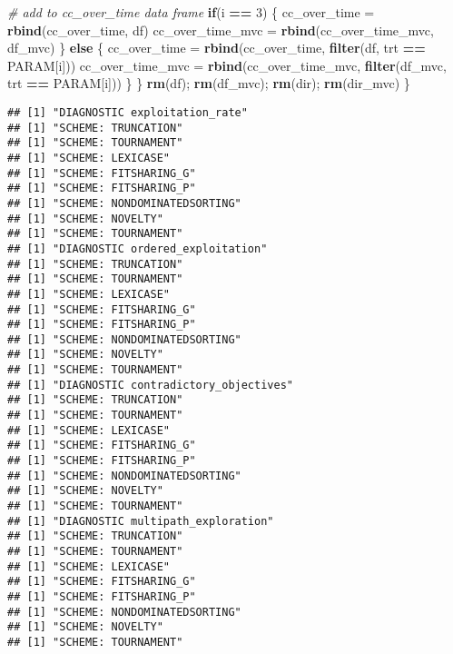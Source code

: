 \documentclass[]{book}
\newenvironment{Shaded}{\begin{snugshade}}{\end{snugshade}}
\newcommand{\CommentTok}[1]{\textcolor[rgb]{0.56,0.35,0.01}{\textit{#1}}}
\newcommand{\ControlFlowTok}[1]{\textcolor[rgb]{0.13,0.29,0.53}{\textbf{#1}}}
\newcommand{\DecValTok}[1]{\textcolor[rgb]{0.00,0.00,0.81}{#1}}
\newcommand{\KeywordTok}[1]{\textcolor[rgb]{0.13,0.29,0.53}{\textbf{#1}}}
\newcommand{\NormalTok}[1]{#1}
\newcommand{\OperatorTok}[1]{\textcolor[rgb]{0.81,0.36,0.00}{\textbf{#1}}}
\newcommand{\StringTok}[1]{\textcolor[rgb]{0.31,0.60,0.02}{#1}}
\begin{document}
\begin{Shaded}
\begin{Highlighting}[]
    \CommentTok{# add to cc_over_time data frame}
    \ControlFlowTok{if}\NormalTok{(i }\OperatorTok{==}\StringTok{ }\DecValTok{3}\NormalTok{)}
\NormalTok{    \{}
\NormalTok{      cc_over_time =}\StringTok{ }\KeywordTok{rbind}\NormalTok{(cc_over_time, df)}
\NormalTok{      cc_over_time_mvc =}\StringTok{ }\KeywordTok{rbind}\NormalTok{(cc_over_time_mvc, df_mvc)}
\NormalTok{    \}}
    \ControlFlowTok{else}
\NormalTok{    \{}
\NormalTok{      cc_over_time =}\StringTok{ }\KeywordTok{rbind}\NormalTok{(cc_over_time, }\KeywordTok{filter}\NormalTok{(df, trt }\OperatorTok{==}\StringTok{ }\NormalTok{PARAM[i]))}
\NormalTok{      cc_over_time_mvc =}\StringTok{ }\KeywordTok{rbind}\NormalTok{(cc_over_time_mvc, }\KeywordTok{filter}\NormalTok{(df_mvc, trt }\OperatorTok{==}\StringTok{ }\NormalTok{PARAM[i]))}
\NormalTok{    \}}
\NormalTok{  \}}
  \KeywordTok{rm}\NormalTok{(df);  }\KeywordTok{rm}\NormalTok{(df_mvc);  }\KeywordTok{rm}\NormalTok{(dir);   }\KeywordTok{rm}\NormalTok{(dir_mvc)}
\NormalTok{\}}
\end{Highlighting}
\end{Shaded}

\begin{verbatim}
## [1] "DIAGNOSTIC exploitation_rate"
## [1] "SCHEME: TRUNCATION"
## [1] "SCHEME: TOURNAMENT"
## [1] "SCHEME: LEXICASE"
## [1] "SCHEME: FITSHARING_G"
## [1] "SCHEME: FITSHARING_P"
## [1] "SCHEME: NONDOMINATEDSORTING"
## [1] "SCHEME: NOVELTY"
## [1] "SCHEME: TOURNAMENT"
## [1] "DIAGNOSTIC ordered_exploitation"
## [1] "SCHEME: TRUNCATION"
## [1] "SCHEME: TOURNAMENT"
## [1] "SCHEME: LEXICASE"
## [1] "SCHEME: FITSHARING_G"
## [1] "SCHEME: FITSHARING_P"
## [1] "SCHEME: NONDOMINATEDSORTING"
## [1] "SCHEME: NOVELTY"
## [1] "SCHEME: TOURNAMENT"
## [1] "DIAGNOSTIC contradictory_objectives"
## [1] "SCHEME: TRUNCATION"
## [1] "SCHEME: TOURNAMENT"
## [1] "SCHEME: LEXICASE"
## [1] "SCHEME: FITSHARING_G"
## [1] "SCHEME: FITSHARING_P"
## [1] "SCHEME: NONDOMINATEDSORTING"
## [1] "SCHEME: NOVELTY"
## [1] "SCHEME: TOURNAMENT"
## [1] "DIAGNOSTIC multipath_exploration"
## [1] "SCHEME: TRUNCATION"
## [1] "SCHEME: TOURNAMENT"
## [1] "SCHEME: LEXICASE"
## [1] "SCHEME: FITSHARING_G"
## [1] "SCHEME: FITSHARING_P"
## [1] "SCHEME: NONDOMINATEDSORTING"
## [1] "SCHEME: NOVELTY"
## [1] "SCHEME: TOURNAMENT"
\end{verbatim}
\end{document}
